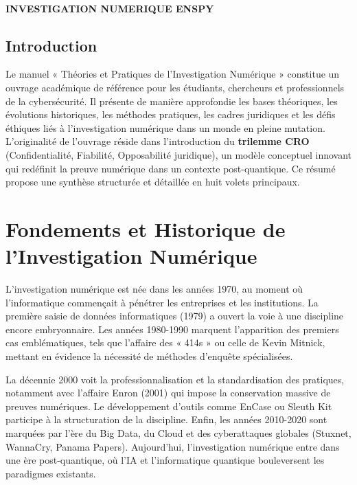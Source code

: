 \documentclass[12pt,a4paper]{article}
\begin{document}
\begin{titlepage}
	\vfill
	
	\begin{center}
		\\[0.3cm]
		\textbf{\color{blueENSPY}INVESTIGATION NUMERIQUE \hspace{4cm}  \hspace{4cm} ENSPY}
	\end{center}
\end{titlepage}
	
\begin{center}
	\section*{\huge Introduction}
\end{center}

{\Large Le manuel « Théories et Pratiques de l’Investigation Numérique » constitue un ouvrage académique de référence pour les étudiants, chercheurs et professionnels de la cybersécurité. Il présente de manière approfondie les bases théoriques, les évolutions historiques, les méthodes pratiques, les cadres juridiques et les défis éthiques liés à l’investigation numérique dans un monde en pleine mutation. L’originalité de l’ouvrage réside dans l’introduction du \textbf{trilemme CRO} (Confidentialité, Fiabilité, Opposabilité juridique), un modèle conceptuel innovant qui redéfinit la preuve numérique dans un contexte post-quantique. Ce résumé propose une synthèse structurée et détaillée en huit volets principaux.}

\section{\centering \huge Fondements et Historique de l’Investigation Numérique}
{\Large L’investigation numérique est née dans les années 1970, au moment où l’informatique commençait à pénétrer les entreprises et les institutions. La première saisie de données informatiques (1979) a ouvert la voie à une discipline encore embryonnaire. Les années 1980-1990 marquent l’apparition des premiers cas emblématiques, tels que l’affaire des « 414s » ou celle de Kevin Mitnick, mettant en évidence la nécessité de méthodes d’enquête spécialisées.

La décennie 2000 voit la professionnalisation et la standardisation des pratiques, notamment avec l’affaire Enron (2001) qui impose la conservation massive de preuves numériques. Le développement d’outils comme EnCase ou Sleuth Kit participe à la structuration de la discipline. Enfin, les années 2010-2020 sont marquées par l’ère du Big Data, du Cloud et des cyberattaques globales (Stuxnet, WannaCry, Panama Papers). Aujourd’hui, l’investigation numérique entre dans une ère post-quantique, où l’IA et l’informatique quantique bouleversent les paradigmes existants.}
\end{document}

